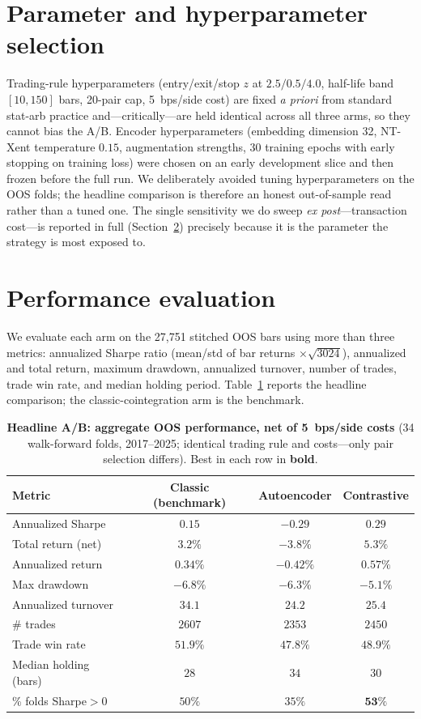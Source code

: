 \documentclass[11pt]{article}
\begin{document}
\section{Parameter and hyperparameter selection}
Trading-rule hyperparameters (entry/exit/stop $z$ at $2.5/0.5/4.0$, half-life band
$[10,150]$ bars, 20-pair cap, 5~bps/side cost) are fixed \emph{a priori} from standard
stat-arb practice and---critically---are held identical across all three arms, so they
cannot bias the A/B. Encoder hyperparameters (embedding dimension 32, NT-Xent
temperature $0.15$, augmentation strengths, 30 training epochs with early stopping on
training loss) were chosen on an early development slice and then frozen before the
full run. We deliberately avoided tuning hyperparameters on the OOS folds; the headline
comparison is therefore an honest out-of-sample read rather than a tuned one. The
single sensitivity we do sweep \emph{ex post}---transaction cost---is reported in full
(Section~\ref{sec:eval}) precisely because it is the parameter the strategy is most
exposed to.

\section{Performance evaluation}\label{sec:eval}
We evaluate each arm on the 27{,}751 stitched OOS bars using more than three metrics:
annualized Sharpe ratio (mean/std of bar returns $\times\sqrt{3024}$), annualized and
total return, maximum drawdown, annualized turnover, number of trades, trade win rate,
and median holding period. Table~\ref{tab:headline} reports the headline comparison;
the classic-cointegration arm is the benchmark.

\begin{table}[t]
\centering
\caption{\textbf{Headline A/B: aggregate OOS performance, net of 5~bps/side costs}
(34 walk-forward folds, 2017--2025; identical trading rule and costs---only pair
selection differs). Best in each row in \textbf{bold}.}
\label{tab:headline}
\small
\begin{tabular}{lccc}
\toprule
Metric & Classic (benchmark) & Autoencoder & \textbf{Contrastive} \\
\midrule
Annualized Sharpe        & $0.15$  & $-0.29$ & $\mathbf{0.29}$ \\
Total return (net)       & $3.2\%$ & $-3.8\%$& $\mathbf{5.3\%}$ \\
Annualized return        & $0.34\%$& $-0.42\%$&$\mathbf{0.57\%}$\\
Max drawdown             & $-6.8\%$& $-6.3\%$& $\mathbf{-5.1\%}$ \\
Annualized turnover      & $34.1$  & $\mathbf{24.2}$ & $25.4$ \\
\# trades                & $2607$  & $2353$  & $2450$ \\
Trade win rate           & $\mathbf{51.9\%}$ & $47.8\%$ & $48.9\%$ \\
Median holding (bars)    & $28$    & $34$    & $30$ \\
\% folds Sharpe$>0$       & $50\%$  & $35\%$  & $\mathbf{53\%}$ \\
\bottomrule
\end{tabular}
\end{table}
\end{document}
